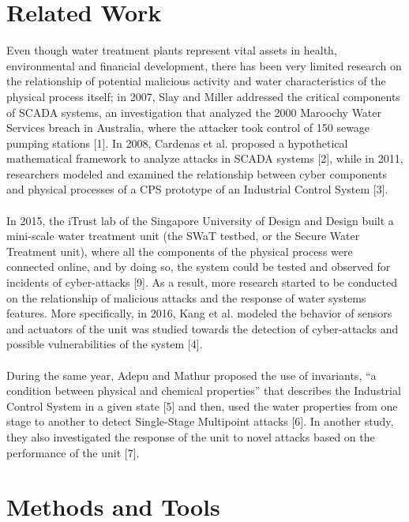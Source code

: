 \documentclass{article}
\begin{document}
\section{Related Work}
Even though water treatment plants represent vital assets in health, environmental and financial development, there has been very limited research on the relationship of potential malicious activity and water characteristics of the physical process itself; in 2007, Slay and Miller addressed the critical components of SCADA systems, an investigation that analyzed the 2000 Maroochy Water Services breach in Australia, where the attacker took control of 150 sewage pumping stations [1]. In 2008, Cardenas et al. proposed a hypothetical mathematical framework to analyze attacks in SCADA systems [2], while in 2011, researchers modeled and examined the relationship between cyber components and physical processes of a CPS prototype of an Industrial Control System [3].  
\\
\\
In 2015, the iTrust lab of the Singapore University of Design and Design built a mini-scale water treatment unit (the SWaT testbed, or the Secure Water Treatment unit), where all the components of the physical process were connected online, and by doing so, the system could be tested and observed for incidents of cyber-attacks [9]. As a result, more research started to be conducted on the relationship of malicious attacks and the response of water systems features. More specifically, in 2016, Kang et al. modeled the behavior of sensors and actuators of the unit was studied towards the detection of cyber-attacks and possible vulnerabilities of the system [4].  
\\
\\
During the same year, Adepu and Mathur proposed the use of invariants, “a condition between physical and chemical properties” that describes the Industrial Control System in a given state [5] and then, used the water properties from one stage to another to detect Single-Stage Multipoint attacks [6]. In another study, they also investigated the response of the unit to novel attacks based on the performance of the unit [7].

\section{Methods and Tools}
\end{document}
